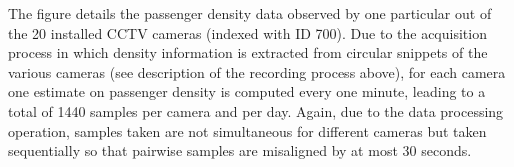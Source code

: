 The figure details the passenger density data observed by one particular out of the 20 installed CCTV cameras (indexed with ID 700).
Due to the acquisition process in which density information is extracted from circular snippets 
of the various cameras (see description of the recording process above), for each camera one estimate on passenger density is computed every one minute, leading to a total of 1440 samples per camera and per day.
Again, due to the data processing operation, samples taken are not simultaneous for different cameras but taken sequentially so that pairwise samples are misaligned by at most 30 seconds.


